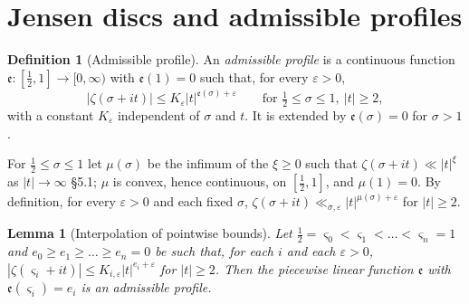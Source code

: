 \documentclass[11pt,reqno]{amsart}
\makeatletter
\let\CG@origcite\cite
\renewcommand*{\cite}[2][]{\def\CG@citekey{#2}%
  \ifx\relax#1\relax\CG@origcite{#2}\else\CG@origcite[#1]{#2}\fi}
\numberwithin{equation}{section}
\newtheorem{lemma}[theorem]{Lemma}
\theoremstyle{definition}
\newtheorem{definition}[theorem]{Definition}
\theoremstyle{remark}
\makeatother
\begin{document}
\section{Jensen discs and admissible profiles}\label{sec:jensen}

\begin{definition}[Admissible profile]\label{def:admissible}
An \emph{admissible profile} is a continuous function $\mathfrak e\colon[\frac12,1]\to[0,\infty)$ with $\mathfrak e(1)=0$ such that, for every $\varepsilon>0$,
\begin{equation}
|\zeta(\sigma+it)|\le K_\varepsilon|t|^{\mathfrak e(\sigma)+\varepsilon}\qquad\text{for }\tfrac12\le\sigma\le1,\ |t|\ge2,
\label{eq:admissible}
\end{equation}
with a constant $K_\varepsilon$ independent of $\sigma$ and $t$. It is extended by $\mathfrak e(\sigma)=0$ for $\sigma>1$.
\end{definition}

For $\frac12\le\sigma\le1$ let $\mu(\sigma)$ be the infimum of the $\xi\ge0$ such that $\zeta(\sigma+it)\ll|t|^\xi$ as $|t|\to\infty$ \cite[\S5.1]{Titchmarsh1986}; $\mu$ is convex, hence continuous, on $[\frac12,1]$, and $\mu(1)=0$. By definition, for every $\varepsilon>0$ and each fixed $\sigma$, $\zeta(\sigma+it)\ll_{\sigma,\varepsilon}|t|^{\mu(\sigma)+\varepsilon}$ for $|t|\ge2$.

\begin{lemma}[Interpolation of pointwise bounds]\label{lem:interpolation}
Let $\frac12=\varsigma_0<\varsigma_1<\dots<\varsigma_n=1$ and $e_0\ge e_1\ge\dots\ge e_n=0$ be such that, for each $i$ and each $\varepsilon>0$, $|\zeta(\varsigma_i+it)|\le K_{i,\varepsilon}|t|^{e_i+\varepsilon}$ for $|t|\ge2$. Then the piecewise linear function $\mathfrak e$ with $\mathfrak e(\varsigma_i)=e_i$ is an admissible profile.
\end{lemma}
\end{document}
